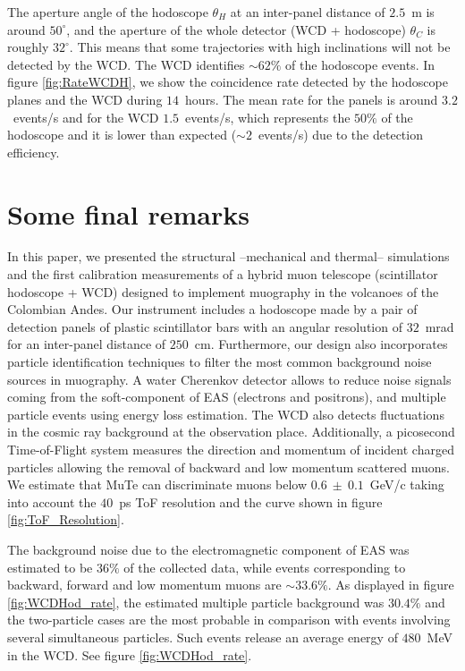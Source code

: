 \documentclass[letterpaper,11pt]{article}
\begin{document}
The aperture angle of the hodoscope $\theta_H$ at an inter-panel distance of $2.5$~m is around $50^{\circ}$, and the aperture of the whole detector (WCD + hodoscope) $\theta_C$ is roughly $32^{\circ}$. This means that some trajectories with high inclinations will not be detected by the WCD. The WCD identifies $\sim 62\%$ of the hodoscope events. In figure \ref{fig:RateWCDH}, we show the coincidence rate detected by the hodoscope planes and the WCD during $14$~hours. The mean rate for the panels is around $3.2$~events/s and for the WCD $1.5$~events/s, which represents the $50\%$ of the hodoscope and it is lower than expected ($\sim 2$~events/s) due to the detection efficiency.


\section{Some final remarks}
\label{conclusions}
In this paper, we presented the structural --mechanical and thermal-- simulations and the first calibration measurements of a hybrid muon telescope (scintillator hodoscope + WCD) designed to implement muography in the volcanoes of the Colombian Andes. Our instrument includes a hodoscope made by a pair of detection panels of plastic scintillator bars with an angular resolution of $32$~mrad for an inter-panel distance of $250$~cm. Furthermore, our design also incorporates particle identification techniques to filter the most common background noise sources in muography. A water Cherenkov detector allows to reduce noise signals coming from the soft-component of EAS (electrons and positrons), and multiple particle events using energy loss estimation. The WCD also detects fluctuations in the cosmic ray background at the observation place. Additionally, a picosecond Time-of-Flight system measures the direction and momentum of incident charged particles allowing the removal of backward and low momentum scattered muons. We estimate that MuTe can discriminate muons below  $0.6~\pm~0.1$~GeV/c taking into account the $40$~ps ToF resolution and the curve shown in figure \ref{fig:ToF_Resolution}.

 The background noise due to the electromagnetic component of EAS was estimated to be $36\%$ of the collected data, while events corresponding to backward, forward and low momentum muons are $\sim 33.6\%$. As displayed in figure \ref{fig:WCDHod_rate}, the estimated multiple particle background was $30.4\%$ and the two-particle cases are the most probable in comparison with events involving several simultaneous particles. Such events release an average energy of $480$~MeV in the WCD. See figure \ref{fig:WCDHod_rate}.
\end{document}
